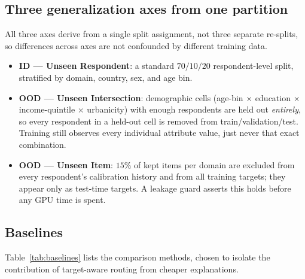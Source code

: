 \documentclass[letterpaper]{article} %
\begin{document}
\subsection{Three generalization axes from one partition}
All three axes derive from a single split assignment, not three separate
re-splits, so differences across axes are not confounded by different training
data.
\begin{itemize}
\item \textbf{ID --- Unseen Respondent}: a standard $70/10/20$ respondent-level
split, stratified by domain, country, sex, and age bin.
\item \textbf{OOD --- Unseen Intersection}: demographic cells (age-bin
$\times$ education $\times$ income-quintile $\times$ urbanicity) with enough
respondents are held out \emph{entirely}, so every respondent in a held-out
cell is removed from train/validation/test. Training still observes every
individual attribute value, just never that exact combination.
\item \textbf{OOD --- Unseen Item}: $15\%$ of kept items per domain are
excluded from every respondent's calibration history and from all training
targets; they appear only as test-time targets. A leakage guard asserts this
holds before any GPU time is spent.
\end{itemize}

\subsection{Baselines}
\label{sec:baselines}
Table~\ref{tab:baselines} lists the comparison methods, chosen to isolate the
contribution of target-aware routing from cheaper explanations.
\end{document}
